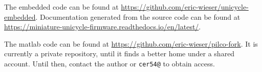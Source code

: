 \documentclass[main.tex]{subfiles}
\begin{document}
The embedded code can be found at \url{https://github.com/eric-wieser/unicycle-embedded}.
Documentation generated from the source code can be found at \url{https://miniature-unicycle-firmware.readthedocs.io/en/latest/}.

The matlab code can be found at \url{https://github.com/eric-wieser/pilco-fork}.
It is currently a private repository, until it finds a better home under a shared account.
Until then, contact the author or \texttt{cer54@} to obtain access.
\end{document}
